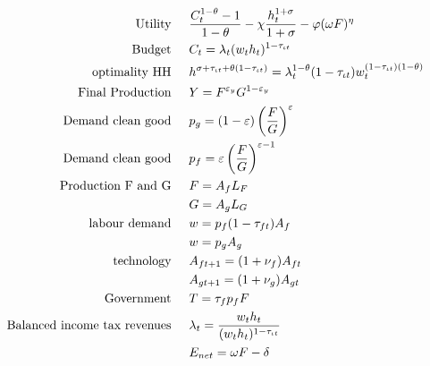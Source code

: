 \begin{align}
\text{Utility}\hspace{5mm}& \frac{C_t^{1-\theta}-1}{1-\theta}-\chi \frac{h_t^{1+\sigma}}{1+\sigma}-\varphi(\omega F)^\eta\\
\text{Budget}\hspace{5mm}& C_t = \lambda_t(w_th_t)^{1-\tau_{\iota t}}\\
\text{optimality HH}\hspace{5mm}& h^{\sigma+\tau_{\iota t}+\theta(1-\tau_{\iota t})}=\lambda_t^{1-\theta}(1-\tau_{\iota t})w_t^{(1-\tau_{\iota t})(1-\theta)}\\
\text{Final Production}\hspace{5mm}&Y=F^{\varepsilon_y}G^{1-
	\varepsilon_y}\\ %
\text{Demand clean good}\hspace{5mm}&p_g=(1-\varepsilon)\left(\frac{F}{G}\right)^\varepsilon\label{eq:ana_dem_clean}\\
\text{Demand clean good}\hspace{5mm}&p_f=\varepsilon\left(\frac{F}{G}\right)^{\varepsilon-1}\label{eq:ana_dem_dirty}\\
\text{Production F and G}\hspace{5mm}&F=A_fL_F\label{eq:ana_prod_F}\\\
& G=A_gL_G\label{eq:ana_prod_G}\\
\text{labour demand}\hspace{5mm}& w=p_f(1-\tau_{ft})A_f\\
& w=p_gA_g\\
\text{technology}\hspace{5mm}&A_{ft+1}=(1+\nu_f)A_{ft}\\
&A_{gt+1}=(1+\nu_g)A_{gt}\\
\text{Government}\hspace{5mm}&T=\tau_{f}p_fF
\\
\text{Balanced income tax revenues}\hspace{5mm}&\lambda_t=\frac{w_t h_t}{(w_t h_t)^{1-\tau_{\iota t}}}\\
&E_{net}=\omega F-\delta
\end{align}
